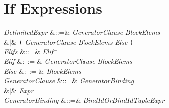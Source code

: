 %
%
%
%

\section{If Expressions}

\begin{Grammar}
\emph{DelimitedExpr}
&::=&  \emph{GeneratorClause}  \emph{BlockElems} 
 \\
&$|$& \texttt{(} \emph{GeneratorClause}  \emph{BlockElems}
 \emph{Else} \texttt{)}\\


\emph{Elifs} &::=& \emph{Elif}$^+$\\

\emph{Elif} &$::=$&  \emph{GeneratorClause}  \emph{BlockElems}\\

\emph{Else} &$::=$&  \emph{BlockElems}\\

\emph{GeneratorClause}
&::=& \emph{GeneratorBinding}\\
&$|$& \emph{Expr} \\

\emph{GeneratorBinding}
&::=& \emph{BindIdOrBindIdTuple}\EXP{\leftarrow}\emph{Expr} \\
\end{Grammar}


